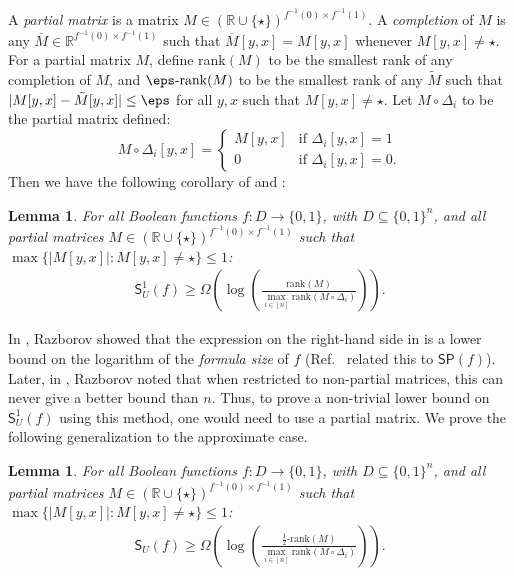 \documentclass[11pt]{article}
\numberwithin{equation}{section}
\newtheorem{lemma}[theorem]{Lemma}
\theoremstyle{definition}
\theoremstyle{plain}
\newcommand{\R}{\mathbb R}
\begin{document}
A \emph{partial matrix} is a matrix $M\in (\R\cup\{\star\})^{f^{-1}(0)\times f^{-1}(1)}$. A \emph{completion} of $M$ is any $\overline{M}\in\R^{f^{-1}(0)\times f^{-1}(1)}$ such that $\overline{M}[y,x]=M[y,x]$ whenever $M[y,x]\neq \star$. For a partial matrix $M$, define rank$(M)$ to be the smallest rank of any completion of $M$, and $\eps\mbox{-rank}(M)$ to be the smallest rank of any $\tilde{M}$ such that $|M[y,x]-\tilde{M}[y,x]|\leq \eps$ for all $y,x$ such that $M[y,x]\neq \star$. Let $M\circ\Delta_i$ to be the partial matrix defined:
$$M\circ \Delta_i[y,x]=\left\{\begin{array}{ll}
M[y,x] & \mbox{if }\Delta_i[y,x]=1\\
0 & \mbox{if }\Delta_i[y,x]=0.
\end{array}\right.$$
Then we have the following corollary of \cite[Lemma 3.2, Theorem 3.4]{Gal01} and :
\begin{lemma}\label{lem:rank-method-one-sided}
For all Boolean functions $f:D\rightarrow\{0,1\}$, with $D\subseteq \{0,1\}^n$, and all partial matrices $M\in (\R\cup\{\star\})^{f^{-1}(0)\times f^{-1}(1)}$ such that $\max\{|M[y,x]|:M[y,x]\neq \star\}\leq 1$:
\begin{align*}
\mathsf{S}_U^1(f)\geq \Omega\left(\log\left(\frac{\mathrm{rank}(M)}{\max_{i\in[n]}\mathrm{rank}(M\circ\Delta_i)}\right)\right).
\end{align*}
\end{lemma}
In \cite{Raz90}, Razborov showed that the expression on the right-hand side in  is a lower bound on the logarithm of the \emph{formula size} of $f$ (Ref.~\cite{Gal01} related this to $\mathsf{SP}(f)$). Later, in \cite{Raz92}, Razborov noted that when restricted to non-partial matrices, this can never give a better bound than $n$. Thus, to prove a non-trivial lower bound on $\mathsf{S}_U^1(f)$ using this method, one would need to use a partial matrix. We prove the following generalization to the approximate case. 
\begin{lemma}\label{lem:rank-method}
For all Boolean functions $f:D\rightarrow\{0,1\}$, with $D\subseteq \{0,1\}^n$, and all partial matrices $M\in (\R\cup\{\star\})^{f^{-1}(0)\times f^{-1}(1)}$ such that $\max\{|M[y,x]|:M[y,x]\neq \star\}\leq 1$:
\begin{align*}
\mathsf{S}_U(f)\geq \Omega\left(\log\left(\frac{\frac{1}{2}\mbox{-}\mathrm{rank}(M)}{\max_{i\in[n]}\mathrm{rank}(M\circ\Delta_i)}\right)\right).
\end{align*}
\end{lemma}
\end{document}
